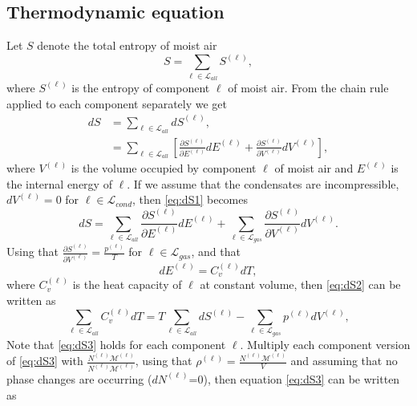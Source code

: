 \documentclass{agujournal}
\begin{document}
{\subsection{Thermodynamic equation}\label{sec:teqn}
Let $S$ denote the total entropy of moist air
\begin{equation}
S=\sum_{\ell \in \mathcal{L}_{all}}S^{(\ell)},
\end{equation}
where $S^{(\ell)}$ is the entropy of component $\ell$ of moist air. From the chain rule applied to each component separately we get
\begin{align}
dS&=\sum_{\ell \in \mathcal{L}_{all}}dS^{(\ell)},\\
  &=\sum_{\ell \in \mathcal{L}_{all}}\left[ \frac{\partial S^{(\ell)}}{\partial E^{(\ell)}}dE^{(\ell)}+\frac{\partial S^{(\ell)}}{\partial V^{(\ell)}}dV^{(\ell)}\right],\label{eq:dS1}
\end{align}
where $V^{(\ell)}$ is the volume occupied by component $\ell$ of moist air and $E^{(\ell)}$ is the internal energy of $\ell$. If we assume that the condensates are incompressible, $dV^{(\ell)}=0$ for $\ell \in \mathcal{L}_{cond}$, then  \eqref{eq:dS1} becomes
\begin{equation}
dS  =\sum_{\ell \in \mathcal{L}_{all}}\frac{\partial S^{(\ell)}}{\partial E^{(\ell)}}dE^{(\ell)}+\sum_{\ell \in \mathcal{L}_{gas}}\frac{\partial S^{(\ell)}}{\partial V^{(\ell)}}dV^{(\ell)}.\label{eq:dS2}
\end{equation}
Using that $\frac{\partial S^{(\ell)}}{\partial V^{(\ell)}}=\frac{p^{(\ell)}}{T}$ for $\ell \in \mathcal{L}_{gas}$, {} and that
\begin{equation}
dE^{(\ell)}=C_v^{(\ell)}dT,
\end{equation}
where $C_v^{(\ell)}$ is the heat capacity of $\ell$ at constant volume, then \eqref{eq:dS2} can be written as
\begin{equation}
\sum_{\ell \in \mathcal{L}_{all}}C_v^{(\ell)}dT = T \sum_{\ell \in \mathcal{L}_{all}}dS^{(\ell)}-\sum_{\ell \in \mathcal{L}_{gas}}p^{(\ell)}dV^{(\ell)},\label{eq:dS3}
\end{equation}
Note that \eqref{eq:dS3} holds for each component $\ell$. Multiply each component version of \eqref{eq:dS3} with $\frac{N^{(\ell)}\mathcal{M}^{(\ell)}}{N^{(\ell)}\mathcal{M}^{(\ell)}}$, using that $\rho^{(\ell)}=\frac{N^{(\ell)}\mathcal{M}^{(\ell)}}{V}$ and assuming that no phase changes are occurring ($dN^{(\ell)}$=0), then equation \eqref{eq:dS3} can be written as
}
\end{document}

